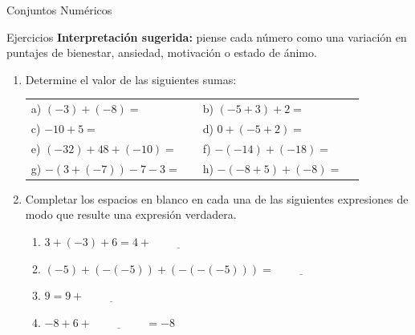 \documentclass[aspectratio=169,handout,11pt]{beamer}
\begin{document}
	\begin{frame}{Conjuntos Numéricos}
		\begin{block}{Ejercicios}
			\textbf{Interpretación sugerida:} piense cada número como una variación en puntajes de bienestar, ansiedad, motivación o estado de ánimo.
			
			\begin{enumerate}
				\item Determine el valor de las siguientes sumas:
				
				\begin{tabular}{llll}
					a) $(-3)+(-8)=$\pause &  & b) $(-5+3)+2=$\pause &  \\
					c) $-10+5=$\pause &  & d) $0+(-5+2)=$\pause &  \\
					e) $(-32)+48+(-10)=$\pause &  & f) $-(-14)+(-18)=$\pause &  \\
					g) $-(3+(-7))-7-3=$\pause &  & h) $-(-8+5)+(-8)=$ & 
				\end{tabular}
				
				\item Completar los espacios en blanco en cada una de las siguientes expresiones de modo que resulte una expresión verdadera.
				
				\begin{enumerate}
					\item $3+(-3)+6=4+\underline{\hspace{2cm}}$
					\pause
					\item $(-5)+(-(-5))+(-(-(-5)))=\underline{\hspace{2cm}}$
					\pause
					\item $9=9+\underline{\hspace{2cm}}$
					\pause
					\item $-8+6+\underline{\hspace{2cm}}=-8$
				\end{enumerate}
			\end{enumerate}
		\end{block}
	\end{frame}
	
\end{document}
